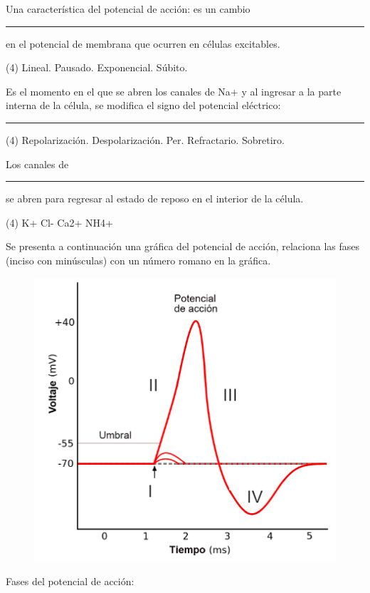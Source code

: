 \documentclass[12pt, letter]{exam}
\begin{document}
\begin{questions}
    \question Una característica del potencial de acción: es un cambio \rule{2cm}{0.1mm} en el potencial de membrana que ocurren en células excitables.
    \begin{tasks}(4)
        \task Lineal.        
        \task Pausado.        
        \task Exponencial.        
        \task Súbito.        
    \end{tasks}
    \question Es el momento en el que se abren los canales de Na+ y al ingresar a la parte interna de la célula, se modifica el signo del potencial eléctrico: \rule{2cm}{0.1mm}
    \begin{tasks}(4)
        \task Repolarización.
        \task Despolarización.
        \task Per. Refractario.
        \task Sobretiro.
    \end{tasks}
    \question Los canales de \rule{2cm}{0.1mm} se abren para regresar al estado de reposo en el interior de la célula.
    \begin{tasks}(4)
        \task K+
        \task Cl-
        \task Ca2+
        \task NH4+
    \end{tasks}

    \newpage

    \question Se presenta a continuación una gráfica del potencial de acción, relaciona las fases (inciso con minúsculas) con un número romano en la gráfica.
    \begin{figure}[H]
        \centering
        \includegraphics[scale=0.75]{Potencial_Accion_07.png}
    \end{figure}

    Fases del potencial de acción:
    \renewcommand{\thepartno}{\alph{partno}}
    \begin{multicols}{2}
    \begin{parts}

\end{parts}
\end{multicols}
\end{questions}
\end{document}
